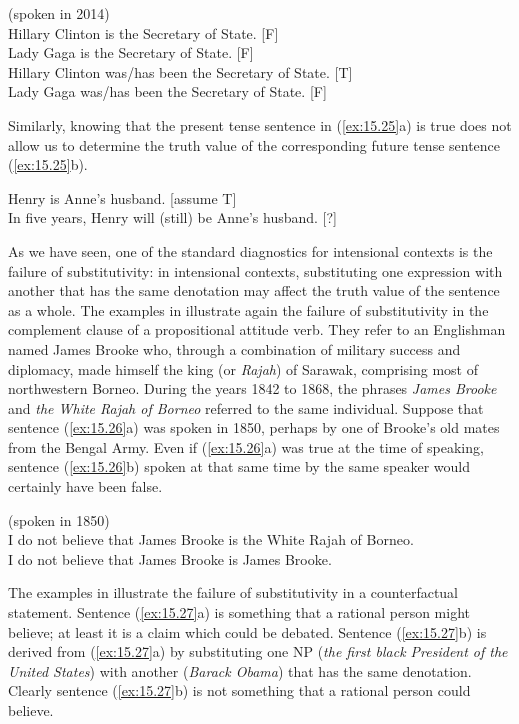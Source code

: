 \ea \label{ex:15.24}
(spoken in 2014)\\
\ea  Hillary Clinton is the Secretary of State.  [F]\\
\ex Lady Gaga is the Secretary of State.  [F]\\
\ex Hillary Clinton was/has been the Secretary of State.  [T]\\
\ex Lady Gaga was/has been the Secretary of State.  [F]
                       \z
\z


Similarly, knowing that the present tense sentence in (\ref{ex:15.25}a) is true does not allow us to determine the truth value of the corresponding future tense sentence (\ref{ex:15.25}b).


\ea \label{ex:15.25}
\ea  Henry is Anne’s husband. \hfill [assume T]\\
\ex In five years, Henry will (still) be Anne’s husband.  \hfill [?]
                       \z
\z


As we have seen, one of the standard diagnostics for intensional contexts is the failure of substitutivity: in intensional contexts, substituting one expression with another that has the same denotation may affect the truth value of the sentence as a whole. The examples in  illustrate again the failure of substitutivity in the complement clause of a propositional attitude verb. They refer to an Englishman named James Brooke who, through a combination of military success and diplomacy, made himself the king (or \textit{Rajah}) of Sarawak, comprising most of northwestern Borneo. During the years 1842 to 1868, the phrases \textit{James Brooke} and \textit{the White Rajah of Borneo} referred to the same individual. Suppose that sentence (\ref{ex:15.26}a) was spoken in 1850, perhaps by one of Brooke’s old mates from the Bengal Army. Even if (\ref{ex:15.26}a) was true at the time of speaking, sentence (\ref{ex:15.26}b) spoken at that same time by the same speaker would certainly have been false.


\ea \label{ex:15.26}
(spoken in 1850)\\
\ea  I do not believe that James Brooke is the White Rajah of Borneo.\\
\ex I do not believe that James Brooke is James Brooke.
                       \z
\z


The examples in  illustrate the failure of substitutivity in a counterfactual statement. Sentence (\ref{ex:15.27}a) is something that a rational person might believe; at least it is a claim which could be debated. Sentence (\ref{ex:15.27}b) is derived from (\ref{ex:15.27}a) by substituting one NP (\textit{the first black President of the United States}) with another (\textit{Barack Obama}) that has the same denotation. Clearly sentence (\ref{ex:15.27}b) is not something that a rational person could believe.


